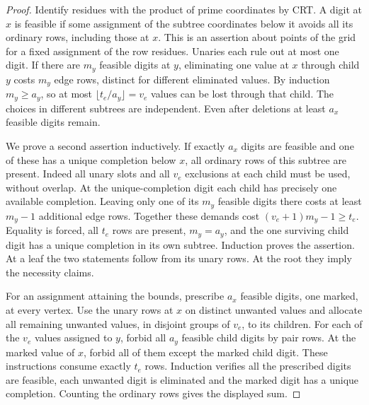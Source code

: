 \documentclass[11pt]{article}
\begin{document}
\begin{proof}
Identify residues with the product of prime coordinates by CRT. A digit at $x$ is feasible if some assignment of the subtree coordinates below it avoids all its ordinary rows, including those at $x$. This is an assertion about points of the grid for a fixed assignment of the row residues. Unaries each rule out at most one digit. If there are $m_y$ feasible digits at $y$, eliminating one value at $x$ through child $y$ costs $m_y$ edge rows, distinct for different eliminated values. By induction $m_y\ge a_y$, so at most $\lfloor t_e/a_y\rfloor=v_e$ values can be lost through that child. The choices in different subtrees are independent. Even after deletions at least $a_x$ feasible digits remain.

We prove a second assertion inductively. If exactly $a_x$ digits are feasible and one of these has a unique completion below $x$, all ordinary rows of this subtree are present. Indeed all unary slots and all $v_e$ exclusions at each child must be used, without overlap. At the unique-completion digit each child has precisely one available completion. Leaving only one of its $m_y$ feasible digits there costs at least $m_y-1$ additional edge rows. Together these demands cost $(v_e+1)m_y-1\ge t_e$. Equality is forced, all $t_e$ rows are present, $m_y=a_y$, and the one surviving child digit has a unique completion in its own subtree. Induction proves the assertion. At a leaf the two statements follow from its unary rows. At the root they imply the necessity claims.

For an assignment attaining the bounds, prescribe $a_x$ feasible digits, one marked, at every vertex. Use the unary rows at $x$ on distinct unwanted values and allocate all remaining unwanted values, in disjoint groups of $v_e$, to its children. For each of the $v_e$ values assigned to $y$, forbid all $a_y$ feasible child digits by pair rows. At the marked value of $x$, forbid all of them except the marked child digit. These instructions consume exactly $t_e$ rows. Induction verifies all the prescribed digits are feasible, each unwanted digit is eliminated and the marked digit has a unique completion. Counting the ordinary rows gives the displayed sum.
\end{proof}
\end{document}
